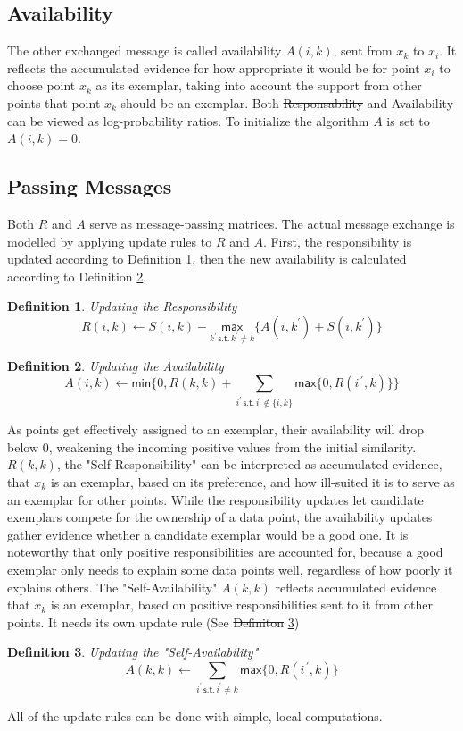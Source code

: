 \documentclass[11pt,a4paper]{article}
\newtheorem{definition}{Definition}
\providecommand{\DIFadd}[1]{{\protect\color{blue}\uwave{#1}}} %
\providecommand{\DIFdel}[1]{{\protect\color{red}\sout{#1}}}                      %
\providecommand{\DIFaddbegin}{} %
\providecommand{\DIFaddend}{} %
\providecommand{\DIFdelbegin}{} %
\providecommand{\DIFdelend}{} %
\newcommand{\DIFscaledelfig}{0.5}
\newlength{\DIFdelgraphicswidth} %
\newlength{\DIFdelgraphicsheight} %
\newcommand{\DIFaddincludegraphics}[2][]{{\color{blue}\fbox{\DIFOincludegraphics[#1]{#2}}}} %
\newcommand{\DIFdelincludegraphics}[2][]{%
\sbox{\DIFdelgraphicsbox}{\DIFOincludegraphics[#1]{#2}}%
\settoboxwidth{\DIFdelgraphicswidth}{\DIFdelgraphicsbox} %
\settoboxtotalheight{\DIFdelgraphicsheight}{\DIFdelgraphicsbox} %
\scalebox{\DIFscaledelfig}{%
\parbox[b]{\DIFdelgraphicswidth}{\usebox{\DIFdelgraphicsbox}\\[-\baselineskip] \rule{\DIFdelgraphicswidth}{0em}}\llap{\resizebox{\DIFdelgraphicswidth}{\DIFdelgraphicsheight}{%
\setlength{\unitlength}{\DIFdelgraphicswidth}%
\begin{picture}(1,1)%
\thicklines\linethickness{2pt} %
{\color[rgb]{1,0,0}\put(0,0){\framebox(1,1){}}}%
{\color[rgb]{1,0,0}\put(0,0){\line( 1,1){1}}}%
{\color[rgb]{1,0,0}\put(0,1){\line(1,-1){1}}}%
\end{picture}%
}\hspace*{3pt}}} %
} %
\DeclareRobustCommand{\DIFaddbegin}{\DIFOaddbegin \let\includegraphics\DIFaddincludegraphics} %
\DeclareRobustCommand{\DIFaddend}{\DIFOaddend \let\includegraphics\DIFOincludegraphics} %
\DeclareRobustCommand{\DIFdelbegin}{\DIFOdelbegin \let\includegraphics\DIFdelincludegraphics} %
\DeclareRobustCommand{\DIFdelend}{\DIFOaddend \let\includegraphics\DIFOincludegraphics} %
\begin{document}
\subsection{Availability}
The other exchanged message is called availability $A(i,k)$, sent from $x_k$ to $x_i$. It reflects the accumulated evidence for how appropriate it would be for point $x_i$ to choose point $x_k$ as its exemplar, taking into account the support from other points that point $x_k$ should be an exemplar. Both \DIFdelbegin \DIFdel{Responsability }\DIFdelend \DIFaddbegin \DIFadd{Responsibility }\DIFaddend and Availability can be viewed as log-probability ratios. To initialize the algorithm $A$ is set to $A(i,k) = 0$. \cite{frey2007clustering}
\pagebreak
\subsection{Passing Messages}
Both $R$ and $A$ serve as message-passing matrices. The actual message exchange is modelled by applying update rules to $R$ and $A$. First, the responsibility is updated according to Definition \ref{def:respupdate}, then the new availability is calculated according to Definition \ref{def:avupdate}.
\begin{definition}\label{def:respupdate}
	Updating the Responsibility
	\[
		R(i,k) \leftarrow S(i,k) - \underset{k^\prime\, \mathsf{s.t.}\, k^\prime \neq k}{\mathsf{max}} \{A(i,k^\prime) + S(i,k^\prime)\}
	\]
\end{definition}
\begin{definition}\label{def:avupdate}
	Updating the Availability
	\[
		A(i,k) \leftarrow \mathsf{min}\{0,R(k,k) + \sum\limits_{i^\prime\,\mathsf{s.t.}\, i^\prime \notin \{i,k\}}\mathsf{max}\{0, R(i^{\, \prime} ,k)\}\}
	\]
\end{definition}
As points get effectively assigned to an exemplar, their availability will drop below 0, weakening the incoming positive values from the initial similarity. $R(k,k)$, the "Self-Responsibility" can be interpreted as accumulated evidence, that $x_k$ is an exemplar, based on its preference, and how ill-suited it is to serve as an exemplar for other points. \cite{frey2007clustering} While the responsibility updates let candidate exemplars compete for the ownership of a data point, the availability updates gather evidence whether a candidate exemplar would be a good one. It is noteworthy that only positive responsibilities are accounted for, because a good exemplar only needs to explain some data points well, regardless of how poorly it explains others. \cite{frey2007clustering} The "Self-Availability" $A(k,k)$ reflects accumulated evidence that $x_k$ is an exemplar, based on positive responsibilities sent to it from other points. It needs its own update rule (See \DIFdelbegin \DIFdel{Definiton }\DIFdelend \DIFaddbegin \DIFadd{Definition }\DIFaddend \ref{def:savupdate})
\begin{definition}\label{def:savupdate}
	Updating the "Self-Availability"
	\[
   		A(k,k) \leftarrow \sum\limits_{i^\prime\, \mathsf{s.t.}\, i^\prime \neq k} \mathsf{max} \{0, R(i^{\, \prime} ,k)\}
	\]
\end{definition}
All of the update rules can be done with simple, local computations. \cite{frey2007clustering}
\end{document}
